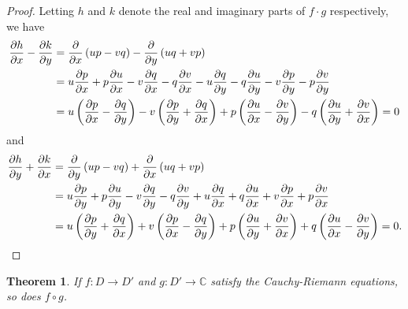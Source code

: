\documentclass[12pt]{article}
\newtheorem{thm}{Theorem}
\begin{document}
\begin{proof}
Letting $h$ and $k$ denote the real and imaginary parts of $f \cdot g$
respectively, we have
\begin{align*}
 {\partial h \over \partial x} - {\partial k \over \partial y} &=
 {\partial \over \partial x} \left( up - vq \right) -
 {\partial \over \partial y} \left( uq + vp \right) \\ &= 
 u {\partial p \over \partial x} + p {\partial u \over \partial x} -
 v {\partial q \over \partial x} - q {\partial v \over \partial x} -
 u {\partial q \over \partial y} - q {\partial u \over \partial y} -
 v {\partial p \over \partial y} - p {\partial v \over \partial y} \\ &=
 u \left( {\partial p \over \partial x} - {\partial q \over \partial y} \right) -
 v \left( {\partial p \over \partial y} + {\partial q \over \partial x} \right) +
 p \left( {\partial u \over \partial x} - {\partial v \over \partial y} \right) -
 q \left( {\partial u \over \partial y} + {\partial v \over \partial x} \right) = 0
\end{align*}
and
\begin{align*}
 {\partial h \over \partial y} + {\partial k \over \partial x} &=
 {\partial \over \partial y} \left( up - vq \right) +
 {\partial \over \partial x} \left( uq + vp \right) \\ &= 
 u {\partial p \over \partial y} + p {\partial u \over \partial y} -
 v {\partial q \over \partial y} - q {\partial v \over \partial y} +
 u {\partial q \over \partial x} + q {\partial u \over \partial x} +
 v {\partial p \over \partial x} + p {\partial v \over \partial x} \\ &=
 u \left( {\partial p \over \partial y} + {\partial q \over \partial x} \right) +
 v \left( {\partial p \over \partial x} - {\partial q \over \partial y} \right) +
 p \left( {\partial u \over \partial y} + {\partial v \over \partial x} \right) +
 q \left( {\partial u \over \partial x} - {\partial v \over \partial y} \right) = 0 .
\end{align*}
\end{proof}

\begin{thm}
If $f \colon D \to D'$ and 
$g \colon D' \to \mathbb{C}$ satisfy the
Cauchy-Riemann equations, so does $f \circ g$.
\end{thm}
\end{document}
